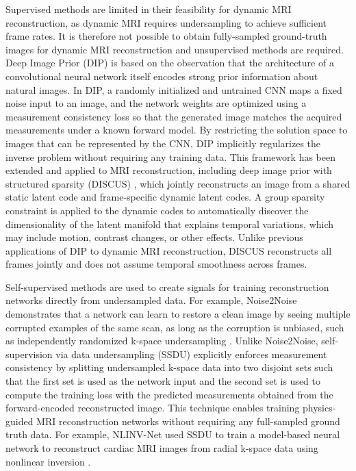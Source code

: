 \documentclass[runningheads]{llncs}
\begin{document}
Supervised methods are limited in their feasibility for dynamic MRI reconstruction, as dynamic MRI requires undersampling to achieve sufficient frame rates. It is therefore not possible to obtain fully-sampled ground-truth images for dynamic MRI reconstruction and unsupervised methods are required. Deep Image Prior (DIP) \cite{Ulyanov_2020} is based on the observation that the architecture of a convolutional neural network itself encodes strong prior information about natural images. In DIP, a randomly initialized and untrained CNN maps a fixed noise input to an image, and the network weights are optimized using a measurement consistency loss so that the generated image matches the acquired measurements under a known forward model. By restricting the solution space to images that can be represented by the CNN, DIP implicitly regularizes the inverse problem without requiring any training data. This framework has been extended and applied to MRI reconstruction, including deep image prior with structured sparsity (DISCUS) \cite{sultan2025unsupervisedmethodmrirecovery}, which jointly reconstructs an image from a shared static latent code and frame-specific dynamic latent codes. A group sparsity constraint is applied to the dynamic codes to automatically discover
the dimensionality of the latent manifold that explains temporal variations, which may include motion, contrast changes, or other effects. Unlike previous applications of DIP to dynamic MRI reconstruction, DISCUS reconstructs all frames jointly and does not assume temporal smoothness across frames.

Self-supervised methods are used to create signals for training reconstruction networks directly from undersampled data. For example, Noise2Noise demonstrates that a network can learn to restore a clean image by seeing multiple corrupted examples of the same scan, as long as the corruption is unbiased, such as independently randomized k-space undersampling \cite{lehtinen2018noise2noiselearningimagerestoration}. Unlike Noise2Noise, self-supervision via data undersampling (SSDU) \cite{Yaman2020SelfSupervised} explicitly enforces measurement consistency by splitting undersampled k-space data into two disjoint sets such that the first set is used as the network input and the second set is used to compute the training loss with the predicted measurements obtained from the forward-encoded reconstructed image. This technique enables training physics-guided MRI reconstruction networks without requiring any full-sampled ground truth data. For example, NLINV-Net used SSDU to train a model-based neural network to reconstruct cardiac MRI images from radial k-space data using nonlinear inversion \cite{nlinvnet}. 
\end{document}

